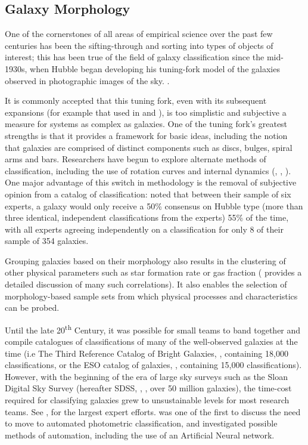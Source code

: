 \documentclass[../main.tex]{subfiles}
\begin{document}
\label{sec:introduction}
\subsection{Galaxy Morphology}
\label{subsec:galaxy-morphology}
One of the cornerstones of all areas of empirical science over the past few centuries has been the sifting-through and sorting into types of objects of interest; this has been true of the field of galaxy classification since the mid-1930s, when Hubble began developing his tuning-fork model of the galaxies observed in photographic images of the sky. \citep{Hubble1936}.

It is commonly accepted that this tuning fork, even with its subsequent expansions (for example that used in \citealt{Sandage1961} and \citealt{deVaucouleurs1991}), is too simplistic and subjective a measure for systems as complex as galaxies. One of the tuning fork's greatest strengths is that it provides a framework for basic ideas, including the notion that galaxies are comprised of distinct components such as discs, bulges, spiral arms and bars. Researchers have begun to explore alternate methods of classification, including the use of rotation curves and internal dynamics (\citealt{2011MNRAS.413..813C}, \citealt{2017MNRAS.469.2539K}, \citealt{Fall2018:1812.06144v1}). One major advantage of this switch in methodology is the removal of subjective opinion from a catalog of classification: \citet{Naim1995:astro-ph/9502078v1} noted that between their sample of six experts, a galaxy would only receive a 50\% consensus on Hubble type (more than three identical, independent classifications from the experts) 55\% of the time, with all experts agreeing independently on a classification for only 8 of their sample of 354 galaxies.

Grouping galaxies based on their morphology also results in the clustering of other physical parameters such as star formation rate or gas fraction (\citealt{RobertsHaynes1994} provides a detailed discussion of many such correlations). It also enables the selection of morphology-based sample sets from which physical processes and characteristics can be probed.

Until the late 20\textsuperscript{th} Century, it was possible for small teams to band together and compile catalogues of classifications of many of the well-observed galaxies at the time (i.e The Third Reference Catalog of Bright Galaxies, \citealt{deVaucouleurs1991}, containing 18,000 classifications, or the ESO catalog of galaxies, \citealt{1989Msngr..56...31L}, containing 15,000 classifications). However, with the beginning of the era of large sky surveys such as the Sloan Digital Sky Survey (hereafter SDSS, \citealt{2017AJ....154...28B}, \citealt{SDSSDR7}, over 50 million galaxies), the time-cost required for classifying galaxies grew to unsustainable levels for most research teams. See \citet{2010yCat..21860427N}, \citet{2007ApJS..173..512S} for the largest expert efforts. \citet{Naim1995:astro-ph/9502078v1} was one of the first to discuss the need to move to automated photometric classification, and investigated possible methods of automation, including the use of an Artificial Neural network.
\end{document}
